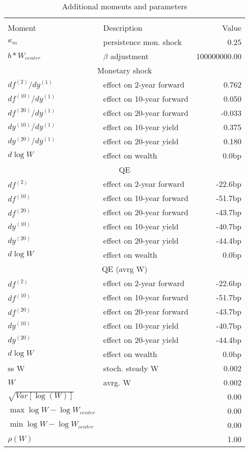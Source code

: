 \begin{table}[htbp]\centering  
 \bgroup  
 \def\arraystretch{1.25}\caption{Additional moments and parameters} 
\begin{tabular}{llr} 
\hline\hline 
\multicolumn{3}{c}{} \\ 
Moment & Description & Value  \\ 
$\kappa_m$ & persistence mon. shock  & 0.25   \\ 
$b*W_{center}$ & $\beta$ adjustment  & 100000000.00   \\ 
\hline 
\multicolumn{3}{c}{Monetary shock} \\ 
$df^{(2)}/dy^{(1)} $ & effect on 2-year forward  & 0.762 \\ 
$df^{(10)}/dy^{(1)} $ & effect on 10-year forward  & 0.050 \\ 
$df^{(20)}/dy^{(1)} $ & effect on 20-year forward  & -0.033 \\ 
$dy^{(10)}/dy^{(1)} $ & effect on 10-year yield  & 0.375 \\ 
$dy^{(20)}/dy^{(1)} $ & effect on 20-year yield  & 0.180 \\ 
$d\log W$ & effect on wealth  & 0.0bp \\ 
\hline 
\multicolumn{3}{c}{QE} \\ 
$df^{(2)}$ & effect on 2-year forward  & -22.6bp \\ 
$df^{(10)}$ & effect on 10-year forward  & -51.7bp \\ 
$df^{(20)}$ & effect on 20-year forward  & -43.7bp \\ 
$dy^{(10)}$ & effect on 10-year yield  & -40.7bp \\ 
$dy^{(20)}$ & effect on 20-year yield  & -44.4bp \\ 
$d\log W$ & effect on wealth  & 0.0bp \\ 
\hline 
\multicolumn{3}{c}{QE (avrg W)} \\ 
$df^{(2)} $ & effect on 2-year forward  & -22.6bp \\ 
$df^{(10)} $ & effect on 10-year forward  & -51.7bp \\ 
$df^{(20)} $ & effect on 20-year forward  & -43.7bp \\ 
$dy^{(10)} $ & effect on 10-year yield  & -40.7bp \\ 
$dy^{(20)} $ & effect on 20-year yield  & -44.4bp \\ 
$d\log W$ & effect on wealth  & 0.0bp \\ 
\hline 
ss W & stoch. steady W & 0.002   \\ 
$W$ & avrg. W & 0.002   \\ 
$\sqrt{Var[\log(W)]}$ &  & 0.00   \\ 
$\max \log W - \log W_{center} $ &  & 0.00   \\ 
$\min \log W - \log W_{center} $ &  & 0.00   \\ 
$\rho(W)$ &  & 1.00   \\ 
\hline 
\hline\hline 
\end{tabular} 
 \egroup 
\end{table} 
